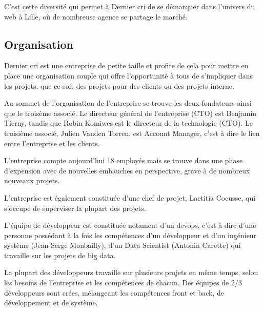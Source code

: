 \documentclass[12pt,a4paper]{article}
\begin{document}
  \bigskip

  C'est cette diversité qui permet à Dernier cri de se démarquer dans
  l'univers du web à Lille, où de nombreuse agence se partage le marché.

  \bigskip

  \subsection{Organisation}\label{organisation}

  \bigskip

  Dernier cri est une entreprise de petite taille et profite de cela pour
  mettre en place une organisation souple qui offre l'opportunité à tous
  de s'impliquer dans les projets, que ce soit des projets pour des
  clients ou des projets interne.

  \bigskip

  Au sommet de l'organisation de l'entreprise se trouve les deux
  fondateurs ainsi que le troisème associé. Le directeur général de
  l'entreprise (CTO) est Benjamin Tierny, tandis que Robin Komiwes est le
  directeur de la technologie (CTO). Le troisième associé, Julien Vanden
  Torren, est Account Manager, c'est à dire le lien entre l'entreprise et
  les clients.

  \bigskip

  L'entreprise compte aujourd'hui 18 employés mais se trouve dans une
  phase d'expension avec de nouvelles embauches en perspective, grave à de
  nombreux nouveaux projets.

  \bigskip

  L'entreprise est également constituée d'une chef de projet, Laetitia
  Cocusse, qui s'occupe de superviser la plupart des projets.

  \bigskip

  L'équipe de développeur est constituée notament d'un devops, c'est à
  dire d'une personne possédant à la fois les compétences d'un développeur
  et d'un ingénieur système (Jean-Serge Monbailly), d'un Data Scientist
  (Antonin Carette) qui travaille sur les projets de big data.

  \bigskip

  La plupart des développeurs travaille sur plusieurs projets en même
  temps, selon les besoins de l'entreprise et les compétences de chacun.
  Des équipes de 2/3 développeurs sont crées, mélangeant les compétences
  front et back, de développement et de système.

  \bigskip
\end{document}
